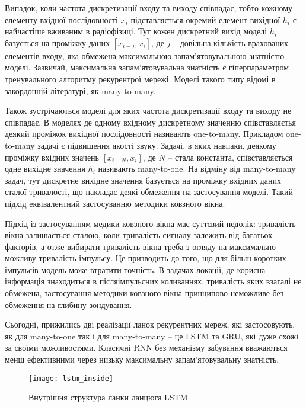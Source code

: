 Випадок, коли частота дискретизації входу та виходу співпадає, тобто кожному 
елементу вхідної послідовності $ x_i $ підставляється окремий елемент 
вихідної $ h_i $ є найчастіше вживаним в радіофізиці. Тут кожен дискретний 
вихід моделі $ h_i $ базується на проміжку даних 
$ \left[ x_{i-j} , x_i \right] $, де $ j $ -- довільна 
кількість врахованих елементів входу, яка обмежена максимальною 
запам'ятовувальною знатністю моделі. Зазвичай, максимальна 
запам'ятовувальна знатність є гіперпараметром тренувального алгоритму 
рекурентрої мережі. Моделі такого типу відомі в закордонній літературі, як 
many-to-many.

Також зустрічаються моделі для яких частота дискретизації входу та виходу 
не співпадає. В моделях де одному вхідному дискретному значенню 
співставляєтья деякий проміжок вихідної послідовності називають one-to-many.
Прикладом one-to-many задачі є підвищення якості звуку. Задачі, в яких 
навпаки, деякому проміжку вхідних значень $ \left[ x_{i-N} , x_i \right] $, 
де $ N $ -- стала константа, співставляється одне вихідне значення $ h_i $
називають many-to-one. На відміну від many-to-many задач, тут 
дискретне вихідне значення базується на проміжку вхідних даних сталої 
тривалості, що накладає деякі обмеження на застосування моделі. Такий 
підхід еквівалентний застосуванню методики ковзного вікна.

Підхід із застосуванням медики ковзного вікна має суттєвий недолік: 
тривалість вікна залишається сталою, коли тривалість сигналу залежить від 
багатьох факторів, а отже вибирати тривалість вікна треба з огляду на 
максимально можливу тривалість імпульсу. Це призводить до того, що для 
більш коротких імпульсів модель може втратити точність. В задачах локації, 
де корисна інформація знаходиться в післяімпульсних коливаннях, тривалість 
яких взагалі не обмежена, застосування методики ковзного вікна принципово 
неможливе без обмеження на глибину зондування.

Сьогодні, прижились дві реалізації ланок рекурентних мереж, які застосовують,
як для many-to-one так і для many-to-many -- це LSTM та GRU, які дуже схожі 
за своїми можливостями. Класичні RNN без механізму забування вважаються менш 
ефективними через низьку максимальну запам'ятовувальну знатність.

\begin{figure}[htbp] \begin{center}
\texttt{[image: lstm\_inside]}
\caption{Внутрішня структура ланки ланцюга LSTM}
\label{fig:lstm_inside}
\end{center} \end{figure}

